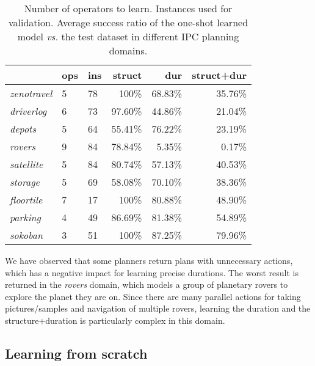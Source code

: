 \documentclass{ecai}
\begin{document}
\begin{table}
\begin{center}
\caption{Number of operators to learn. Instances used for validation. Average success ratio of the one-shot learned model \emph{vs.} the test dataset in different IPC planning domains.}
\begin{scriptsize}
\begin{tabular}{l|llrrr}
\hline	
& {\bf ops} & {\bf ins} & {\bf struct} & {\bf dur} & {\bf struct+dur}  \\\hline

\emph{zenotravel} & 5 & 78 & 100\% & 68.83\% & 35.76\% \\
\emph{driverlog} & 6 & 73 & 97.60\% & 44.86\% & 21.04\% \\
\emph{depots} & 5 & 64 & 55.41\% & 76.22\% & 23.19\% \\
\emph{rovers} & 9 & 84 & 78.84\% & 5.35\% & 0.17\% \\
\emph{satellite} & 5 & 84 & 80.74\% & 57.13\% & 40.53\% \\
\emph{storage} & 5 & 69 & 58.08\% & 70.10\% & 38.36\% \\
\emph{floortile} & 7 & 17 & 100\% & 80.88\% & 48.90\%\\
\emph{parking} & 4 & 49 & 86.69\% & 81.38\% & 54.89\% \\
\emph{sokoban} & 3 & 51 & 100\% & 87.25\% & 79.96\% \\

\end{tabular}
\end{scriptsize}
\label{table:evaluationExperiments}
\end{center}
\end{table}


We have observed that some planners return plans with unnecessary actions, which has a negative impact for learning precise durations.
The worst result is returned in the \emph{rovers} domain, which models a group of planetary rovers to explore the planet they are on. Since there are many parallel actions for taking pictures/samples and navigation of multiple rovers, learning the duration and the structure+duration is particularly complex in this domain.

\subsection{Learning from scratch}
\end{document}
